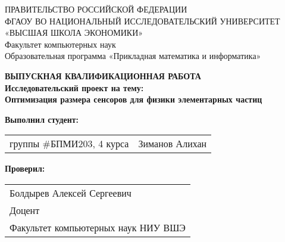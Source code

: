 \begin{titlepage}
\newpage

{
\begin{center}
ПРАВИТЕЛЬСТВО РОССИЙСКОЙ ФЕДЕРАЦИИ\\
ФГАОУ ВО НАЦИОНАЛЬНЫЙ ИССЛЕДОВАТЕЛЬСКИЙ УНИВЕРСИТЕТ\\
«ВЫСШАЯ ШКОЛА ЭКОНОМИКИ»
\\
\bigskip
Факультет компьютерных наук\\
Образовательная программа «Прикладная математика и информатика»
\end{center}
}

\vspace{7em}

\begin{center}
{\bf ВЫПУСКНАЯ КВАЛИФИКАЦИОННАЯ РАБОТА}\\
{\bf Исследовательский проект на тему:}\\
{\bf Оптимизация размера сенсоров для физики элементарных частиц}\\
\end{center}

\vspace{2em}

{\bf Выполнил студент: \vspace{2mm}}

{
\begin{tabular}{l@{\hskip 1.5cm}l}
группы \#БПМИ203, 4 курса & Зиманов Алихан
\end{tabular}}


\vspace{1em}
{\bf Проверил: \vspace{2mm}}

{
\begin{tabular}{l}
Болдырев Алексей Сергеевич\\
Доцент\\
Факультет компьютерных наук НИУ ВШЭ 
\end{tabular}}


\end{titlepage}
